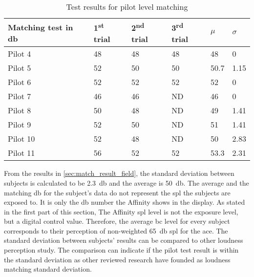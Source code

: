 \begin{table}[H]
\centering
\caption{Test results for pilot level matching}
\begin{tabular}{l|lll|ll}
Matching test in \si{\decibel}   & 1\textsuperscript{st} trial & 2\textsuperscript{nd} trial & 3\textsuperscript{rd} trial & $\mu$ & $\sigma$ \\ \hline
Pilot 4  & 48          & 48           & 48          & 48          & 0                  \\
Pilot 5  & 52          & 50           & 50          & 50.7        & 1.15               \\
Pilot 6  & 52          & 52           & 52          & 52          & 0                  \\
Pilot 7  & 46          & 46           & ND          & 46          & 0                  \\
Pilot 8  & 50          & 48           & ND          & 49          & 1.41               \\
Pilot 9  & 52          & 50           & ND          & 51          & 1.41               \\
Pilot 10  & 52          & 48           & ND          & 50          & 2.83               \\
Pilot 11  & 56          & 52           & 52          & 53.3        & 2.31             
\end{tabular}
\label{sec:match_result_field}
\end{table}

From the results in \autoref{sec:match_result_field}, the standard deviation between subjects is calculated to be \SI{2.3}{\decibel} and the average is \SI{50}{\decibel}. The average and the matching \si{\decibel} for the subject's data do not represent the \gls{spl} the subjects are exposed to. It is only the \si{\decibel} number the Affinity shows in the display. As stated in the first part of this section, The Affinity  \gls{spl} level is not the exposure level, but a digital control value. Therefore, the average \gls{bc} level for every subject corresponds to their perception of non-weighted \SI{65}{\decibel} \gls{spl}  for the \gls{ace}. The standard deviation between subjects' results can be compared to other loudness perception study. The comparison can indicate if the pilot test result is within the standard deviation as other reviewed research have founded as loudness matching standard deviation. 

